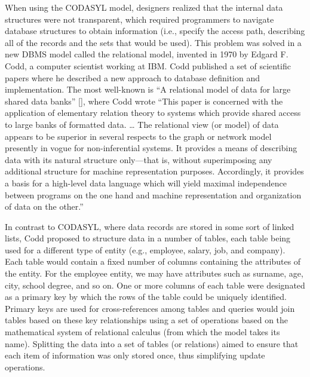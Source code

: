 When using the CODASYL model, designers realized that the internal data structures were not transparent, which required programmers to navigate database structures to obtain information (i.e., specify the access path, describing all of the records and the sets that would be used). This problem was solved in a new DBMS model called the relational model, invented in 1970 by Edgard F. Codd, a computer scientist working at IBM. Codd published a set of scientific papers where he described a new approach to database definition and implementation. The most well-known is ``A relational model of data for large shared data banks'' [\citealt{chap:3:Codd:1970}], where Codd wrote ``This paper is concerned with the application of elementary relation theory to systems which provide shared access to large banks of formatted data. {\dots} The relational view (or model) of data appears to be superior in several respects to the graph or network model presently in vogue for non-inferential systems. It provides a means of describing data with its natural structure only---that is, without superimposing any additional structure for machine representation purposes. Accordingly, it provides a basis for a high-level data language which will yield maximal independence between programs on the one hand and machine representation and organization of data on the other.''


In contrast to CODASYL, where data records are stored in some sort of linked lists, Codd proposed to structure data in a number of tables, each table being used for a different type of entity (e.g., employee, salary, job, and company). Each table would contain a fixed number of columns containing the attributes of the entity. For the employee entity, we may have attributes such as surname, age, city, school degree, and so on. One or more columns of each table were designated as a primary key by which the rows of the table could be uniquely identified. Primary keys are used for cross-references among tables and queries would join tables based on these key relationships using a set of operations based on the mathematical system of relational calculus (from which the model takes its name). Splitting the data into a set of tables (or relations) aimed to ensure that each item of information was only stored once, thus simplifying update operations.

